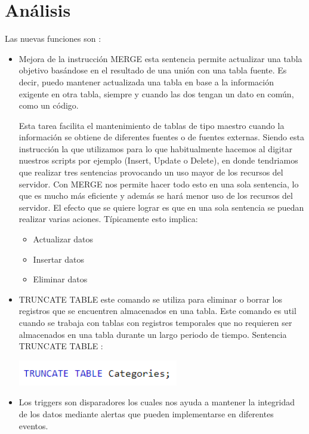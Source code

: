\documentclass[twoside,twocolumn]{article}
\begin{document}
\section{Análisis}
Las nuevas funciones son :
\begin{itemize}
\item Mejora de la instrucción MERGE esta sentencia permite actualizar una tabla objetivo basándose en el resultado de una unión con una tabla fuente. Es decir, puedo mantener actualizada una tabla en base a la información exigente en otra tabla, siempre y cuando las dos tengan un dato en común, como un código.

Esta tarea facilita el mantenimiento de tablas de tipo maestro cuando la información se obtiene de diferentes fuentes o de fuentes externas. Siendo esta instrucción la que utilizamos para lo que habitualmente hacemos al digitar nuestros scripts por ejemplo (Insert, Update o Delete), en donde tendriamos que realizar tres sentencias provocando un uso mayor de los recursos del servidor. Con MERGE nos permite hacer todo esto en una sola sentencia, lo que es mucho más eficiente y además se hará menor uso de los recursos del servidor.
El efecto que se quiere lograr es que en una sola sentencia se puedan realizar varias aciones. Típicamente esto implica:
\begin{itemize}
\item Actualizar datos
\item Insertar datos
\item Eliminar datos
\end{itemize}

\item TRUNCATE TABLE este comando se utiliza para eliminar o borrar los registros que se encuentren almacenados en una tabla. Este comando es util cuando se trabaja con tablas con registros temporales que no requieren ser almacenados en una tabla durante un largo periodo de tiempo.
Sentencia TRUNCATE TABLE :

\begin{center}
\includegraphics[width=7cm]{./Imagenes/01} 
\end{center}
\item Los triggers son disparadores los cuales nos ayuda a mantener la integridad de los datos mediante alertas que pueden implementarse en diferentes eventos.
 

\end{itemize}
\end{document}
